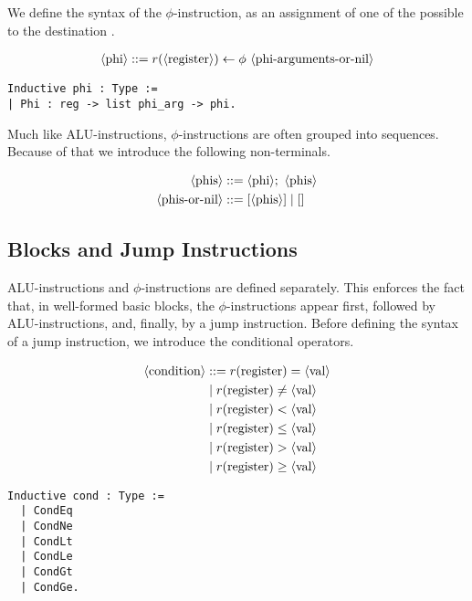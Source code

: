 We define the syntax of the $\phi$-instruction, as an assignment of one of the possible  to the destination .

\begin{align*}
\nt{phi} ::= r( \nt{register} ) \leftarrow \phi \ \nt{phi-arguments-or-nil}
\end{align*}

\begin{lstlisting}[style=Rocq]
Inductive phi : Type :=
| Phi : reg -> list phi_arg -> phi.
\end{lstlisting}

Much like ALU-instructions, $\phi$-instructions are often grouped into sequences. Because of that we introduce the following non-terminals.

\begin{align*}
\langle\text{phis}\rangle &::= \langle\text{phi}\rangle ; \ \langle\text{phis}\rangle \\
\langle\text{phis-or-nil}\rangle &::= [ \langle\text{phis}\rangle ] \mid []
\end{align*}


\subsection{Blocks and Jump Instructions}

ALU-instructions and $\phi$-instructions are defined separately. This enforces the fact that, in well-formed basic blocks, the $\phi$-instructions appear first, followed by ALU-instructions, and, finally, by a jump instruction.
Before defining the syntax of a jump instruction, we introduce the conditional operators.

\begin{minipage}{0.45\linewidth}
\begin{align*}
\langle\text{condition}\rangle &::= r(\text{register}) = \langle\text{val}\rangle \\
&\mid r(\text{register}) \neq \langle\text{val}\rangle \\
&\mid r(\text{register}) < \langle\text{val}\rangle \\
&\mid r(\text{register}) \leq \langle\text{val}\rangle \\
&\mid r(\text{register}) > \langle\text{val}\rangle \\
&\mid r(\text{register}) \geq \langle\text{val}\rangle \\
\end{align*}
\end{minipage}
\hfill
\begin{minipage}{0.45\linewidth}
\begin{lstlisting}[style=Rocq]
Inductive cond : Type :=
  | CondEq
  | CondNe
  | CondLt
  | CondLe
  | CondGt
  | CondGe.
\end{lstlisting}
\end{minipage}

